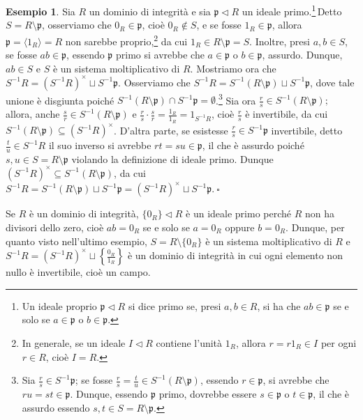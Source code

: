 \documentclass{article}
\theoremstyle{definition}
\newtheorem*{exm}{Esempio}
\begin{document}
\begin{exm}Sia $R$ un dominio di integrità e sia $\mathfrak{p}\lhd R$ un ideale primo.\footnote{Un ideale proprio $\mathfrak{p}\lhd R$ si dice primo se, presi $a,b\in R$, si ha che $ab\in \mathfrak{p}$ se e solo se $a\in \mathfrak{p}$ o $b\in \mathfrak{p}$.}\,Detto $S=R\setminus \mathfrak{p}$, osserviamo che $0_R\in \mathfrak{p}$, cioè $0_R\not\in S$, e se fosse $1_R \in\mathfrak{p}$, allora $\mathfrak{p}=\langle 1_R\rangle =R$ non sarebbe proprio,\footnote{In generale, se un ideale $I\lhd R$ contiene l'unità $1_R$, allora $r=r1_R\in I$ per ogni $r\in R$, cioè $I=R$.} da cui $1_R\in R\setminus \mathfrak{p}=S$. Inoltre, presi $a,b\in S$, se fosse $ab\in \mathfrak{p}$, essendo $\mathfrak{p}$ primo si avrebbe che $a\in \mathfrak{p}$ o $b\in\mathfrak{p}$, assurdo. Dunque, $ab\in S$ e $S$ è un sistema moltiplicativo di $R.$ Mostriamo ora che $S^{-1}R=(S^{-1}R)^{\times}\sqcup S^{-1}\mathfrak{p}$. Osserviamo che $S^{-1}R=S^{-1}(R\setminus \mathfrak{p}) \sqcup S^{-1}\mathfrak{p}$, dove tale unione è disgiunta poiché $S^{-1}(R\setminus \mathfrak{p}) \cap S^{-1}\mathfrak{p}=\emptyset$.\footnote{Sia $\frac{r}{s}\in S^{-1}\mathfrak{p}$; se fosse $\frac{r}{s}=\frac{t}{u}\in S^{-1}(R\setminus\mathfrak{p})$, essendo $r\in \mathfrak{p}$, si avrebbe che $ru=st\in \mathfrak{p}$. Dunque, essendo $\mathfrak{p}$ primo, dovrebbe essere $s\in \mathfrak{p}$ o $t\in\mathfrak{p}$, il che è assurdo essendo $s,t \in S=R\setminus\mathfrak{p}$.} Sia ora $\frac{r}{s}\in S^{-1}(R\setminus\mathfrak{p});$ allora, anche $\frac{s}{r}\in S^{-1}(R\setminus\mathfrak{p})$ e $\frac{r}{s}\cdot \frac{s}{r}=\frac{1_R}{1_R}=1_{S^{-1}R}$, cioè $\frac{r}{s}$ è invertibile, da cui $S^{-1}(R\setminus\mathfrak{p})\subseteq (S^{-1}R)^{\times}$. D'altra parte, se esistesse $\frac{r}{s}\in S^{-1}\mathfrak{p}$ invertibile, detto $\frac{t}{u}\in S^{-1}R$ il suo inverso si avrebbe $rt=su\in \mathfrak{p}$, il che è assurdo poiché $s,u \in S=R\setminus \mathfrak{p}$ violando la definizione di ideale primo. Dunque $(S^{-1}R)^{\times}\subseteq S^{-1}(R\setminus\mathfrak{p})$, da cui $S^{-1}R=S^{-1}(R\setminus \mathfrak{p}) \sqcup S^{-1}\mathfrak{p}=(S^{-1}R)^{\times}\sqcup S^{-1}\mathfrak{p}. \ \square$\end{exm}

\noindent Se $R$ è un dominio di integrità, $\{0_R\}\lhd R$ è un ideale primo perché $R$ non ha divisori dello zero, cioè $ab=0_R$ se e solo se $a=0_R$ oppure $b=0_R$. Dunque, per quanto visto nell'ultimo esempio, $S=R\setminus \{0_R\}$ è un sistema moltiplicativo di $R$ e $S^{-1}R=(S^{-1}R)^{\times} \sqcup \left\{ \frac{0_R}{1_R} \right\}$ è un dominio di integrità in cui ogni elemento non nullo è invertibile, cioè un campo.
\end{document}
